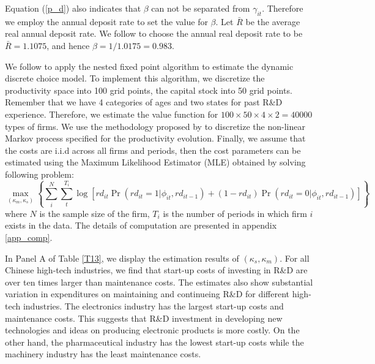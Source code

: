 \documentclass[11pt]{article}
\begin{document}
Equation (\ref{p_d}) also indicates that $\beta$ can not be separated from $\gamma_{it}$. Therefore we employ the annual deposit rate to set the value for $\beta$. Let $\bar R$ be the average real annual deposit rate. We follow \citet{song2011} to choose the annual real deposit rate to be $\bar R=1.1075$, and hence $\beta =1/1.0175=0.983$.

We follow \citet{Rust1987} to apply the nested fixed point algorithm to estimate the dynamic discrete choice model. To implement this algorithm, we discretize the productivity space into 100 grid points, the capital stock into 50 grid points. Remember that we have 4 categories of ages and two states for past R\&D experience. Therefore, we estimate the value function for $100\times 50 \times 4\times 2=40000$ types of firms. We use the methodology proposed by \citet{farmer2017} to discretize the non-linear Markov process specified for the productivity evolution. Finally, we assume that the costs are i.i.d across all firms and periods, then the cost parameters can be estimated using the Maximum Likelihood Estimator (MLE)  obtained by solving following problem:
\begin{equation}
\max_{(\kappa_{m},\kappa_{s})}\left\{\sum_{i}^{N}\sum_{t}^{T_i} \log \left[ rd_{it}\Pr(rd_{it}=1|\phi_{it},rd_{it-1})+(1-rd_{it})\Pr(rd_{it}=0|\phi_{it},rd_{it-1})\right] \right\}
\end{equation}
where $N$ is the sample size of the firm, $T_i$ is the number of periods in which firm $i$ exists in the data. The details of computation are presented in appendix \ref{app_comp}.

In Panel A of Table \ref{T13}, we display the estimation results of $(\kappa_s,\kappa_m)$. For all Chinese high-tech industries, we find that start-up costs of investing in R\&D are over ten times larger than maintenance costs. The estimates also show substantial variation in expenditures on maintaining and continueing R\&D for different high-tech industries. The electronics industry has the largest start-up costs and maintenance costs. This suggests that R\&D investment in developing new technologies and ideas on producing electronic products is more costly. On the other hand, the pharmaceutical industry has the lowest start-up costs while the machinery industry has the least maintenance costs. 
\end{document}
